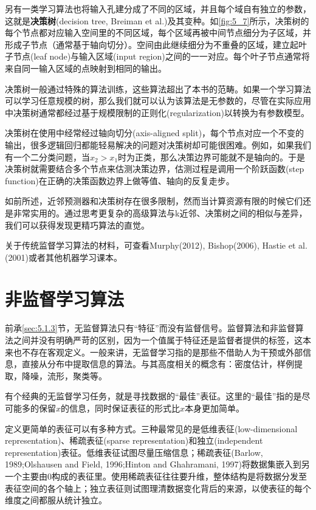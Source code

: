 另有一类学习算法也将输入孔建分成了不同的区域，并且每个域自有独立的参数，这就是\textbf{决策树}(decision tree, Breiman et al.)及其变种。如\ref{fig:5_7}所示，决策树的每个节点都对应输入空间里的不同区域，每个区域再被中间节点细分为子区域，并形成子节点（通常基于轴向切分）。空间由此继续细分为不重叠的区域，建立起叶子节点(leaf node)与输入区域(input region)之间的一一对应。每个叶子节点通常将来自同一输入区域的点映射到相同的输出。

决策树一般通过特殊的算法训练，这些算法超出了本书的范畴。如果一个学习算法可以学习任意规模的树，那么我们就可以认为该算法是无参数的，尽管在实际应用中决策树通常都经过基于规模限制的正则化(regularization)以转换为有参数模型。

决策树在使用中经常经过轴向切分(axis-aligned split)，每个节点对应一个不变的输出，很多逻辑回归都能轻易解决的问题对决策树却可能很困难。例如，如果我们有一个二分类问题，当$x_{2} > x_{1}$时为正类，那么决策边界可能就不是轴向的。于是决策树就需要结合多个节点来估测决策边界，估测过程是调用一个阶跃函数(step function)在正确的决策函数边界上做等值、轴向的反复走步。

如前所述，近邻预测器和决策树存在很多限制，然而当计算资源有限的时候它们还是非常实用的。通过思考更复杂的高级算法与k近邻、决策树之间的相似与差异，我们可以获得发现更精巧算法的直觉。

关于传统监督学习算法的材料，可查看Murphy(2012), Bishop(2006), Hastie et al.(2001)或者其他机器学习课本。

\section{非监督学习算法}
\label{sec:5.8}

前承\ref{sec:5.1.3}节，无监督算法只有“特征”而没有监督信号。监督算法和非监督算法之间并没有明确严苛的区别，因为一个值属于特征还是监督者提供的标签，这本来也不存在客观定义。一般来讲，无监督学习指的是那些不借助人为干预或外部信息，直接从分布中提取信息的算法。与其高度相关的概念有：密度估计，样例提取，降噪，流形，聚类等。

有个经典的无监督学习任务，就是寻找数据的“最佳”表征。这里的“最佳”指的是尽可能多的保留$x$的信息，同时保证表征的形式比$x$本身更加简单。

定义更简单的表征可以有多种方式。三种最常见的是低维表征(low-dimensional representation)、稀疏表征(sparse representation)和独立(independent representation)表征。低维表征试图尽量压缩信息；稀疏表征(Barlow, 1989;Olshausen and Field, 1996;Hinton and Ghahramani, 1997)将数据集嵌入到另一个主要由0构成的表征里。使用稀疏表征往往要升维，整体结构是将数据分发至表征空间的各个轴上；独立表征则试图理清数据变化背后的来源，以使表征的每个维度之间都服从统计独立。

